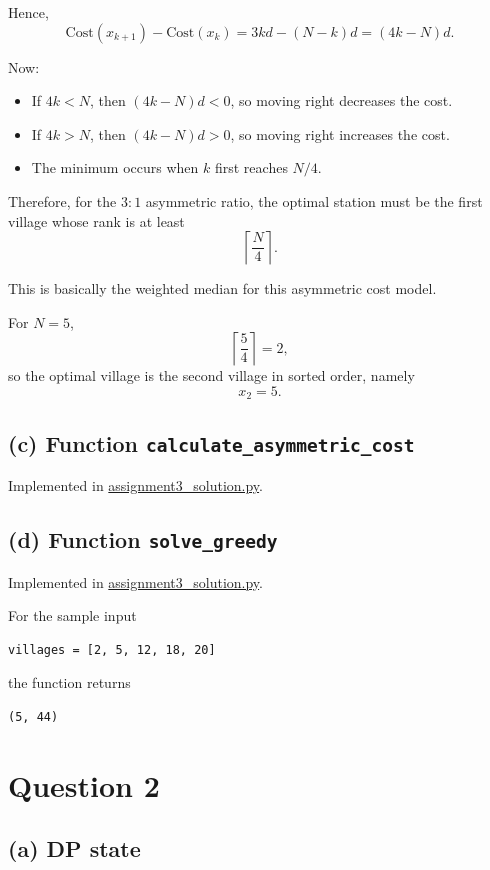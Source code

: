 \documentclass[12pt]{article}
\begin{document}
Hence,
\[
\mathrm{Cost}(x_{k+1})-\mathrm{Cost}(x_k)=3kd-(N-k)d=(4k-N)d.
\]

Now:
\begin{itemize}
    \item If \(4k<N\), then \((4k-N)d<0\), so moving right decreases the cost.
    \item If \(4k>N\), then \((4k-N)d>0\), so moving right increases the cost.
    \item The minimum occurs when \(k\) first reaches \(N/4\).
\end{itemize}

Therefore, for the \(3{:}1\) asymmetric ratio, the optimal station must be the first village whose rank is at least
\[
\left\lceil \frac{N}{4} \right\rceil.
\]

This is basically the weighted median for this asymmetric cost model.

For \(N=5\),
\[
\left\lceil \frac{5}{4} \right\rceil = 2,
\]
so the optimal village is the second village in sorted order, namely
\[
x_2=5.
\]

\subsection*{(c) Function \texttt{calculate\_asymmetric\_cost}}

Implemented in \href{run:assignment3_solution.py}{assignment3\_solution.py}.

\subsection*{(d) Function \texttt{solve\_greedy}}

Implemented in \href{run:assignment3_solution.py}{assignment3\_solution.py}.

For the sample input
\begin{verbatim}
villages = [2, 5, 12, 18, 20]
\end{verbatim}
the function returns
\begin{verbatim}
(5, 44)
\end{verbatim}

\section*{Question 2}

\subsection*{(a) DP state}
\end{document}
